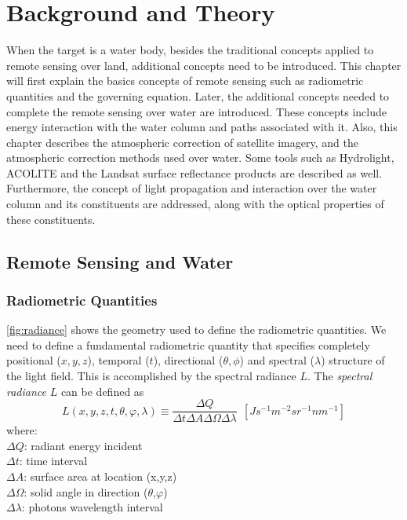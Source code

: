 \chapter{Background and Theory}
\label{ch:background}
When the target is a water body, besides the traditional concepts applied to remote sensing over land, additional concepts need to be introduced. This chapter will first explain the basics concepts of remote sensing such as radiometric quantities and the governing equation. Later, the additional concepts needed to complete the remote sensing over water are introduced. These concepts include energy interaction with the water column and paths associated with it. Also, this chapter describes the atmospheric correction of satellite imagery, and the atmospheric correction methods used over water. Some tools such as Hydrolight, ACOLITE and the Landsat surface reflectance products are described as well. Furthermore, the concept of light propagation and interaction over the water column and its constituents are addressed, along with the optical properties of these constituents.  
\section{Remote Sensing and Water}
\subsection{Radiometric Quantities}
\autoref{fig:radiance} shows the geometry used to define the radiometric quantities. We need to define a fundamental radiometric quantity that specifies completely positional ($x,y,z$), temporal ($t$), directional ($\theta,\phi$) and spectral ($\lambda$) structure of the light field. This is accomplished by the spectral radiance $L$. The {\it spectral radiance} $L$  can be defined as \citep{Mobley:2001}
\begin{equation}\label{eq:rad1}
  L(x,y,z,t,\theta,\varphi,\lambda)\equiv\frac{\Delta Q}{\Delta t\Delta A\Delta\Omega\Delta\lambda}~~\left[ Js^{-1}m^{-2}sr^{-1}nm^{-1} \right]
\end{equation}
where:\\
      \noindent $\Delta Q$: radiant energy incident \\
      $\Delta t$: time interval \\
      $\Delta A$: surface area at location (x,y,z)\\
      $\Delta\Omega$: solid angle in direction ($\theta$,$\varphi$) \\
      $\Delta\lambda$: photons wavelength interval

